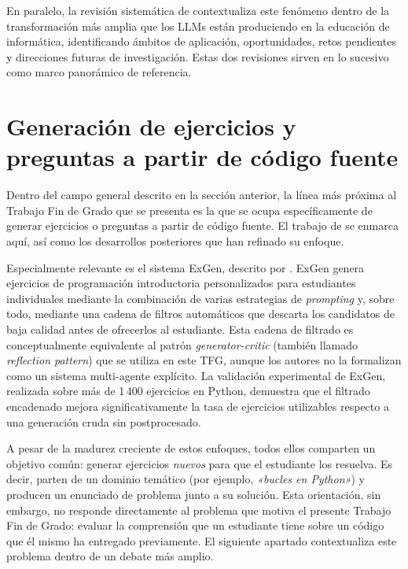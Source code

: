 En paralelo, la revisión sistemática de \textcite{raihan2025llmcse}
contextualiza este fenómeno dentro de la transformación más amplia que
los LLMs están produciendo en la educación de informática, identificando
ámbitos de aplicación, oportunidades, retos pendientes y direcciones
futuras de investigación. Estas dos revisiones sirven en lo sucesivo
como marco panorámico de referencia.


\section{Generación de ejercicios y preguntas a partir de código fuente}
\label{sec:aqg-codigo}

Dentro del campo general descrito en la sección anterior, la línea más
próxima al Trabajo Fin de Grado que se presenta es la que se ocupa
específicamente de generar ejercicios o preguntas a partir de código
fuente. El trabajo de \textcite{sarsa2022autogen} se enmarca aquí, así
como los desarrollos posteriores que han refinado su enfoque.

Especialmente relevante es el sistema ExGen, descrito por
\textcite{ta2026exgen}. ExGen genera ejercicios de programación
introductoria personalizados para estudiantes individuales mediante la
combinación de varias estrategias de \emph{prompting} y, sobre todo,
mediante una cadena de filtros automáticos que descarta los candidatos
de baja calidad antes de ofrecerlos al estudiante. Esta cadena de
filtrado es conceptualmente equivalente al patrón
\emph{generator-critic} (también llamado \emph{reflection pattern}) que
se utiliza en este TFG, aunque los autores no la formalizan como un
sistema multi-agente explícito. La validación experimental de ExGen,
realizada sobre más de 1\,400 ejercicios en Python, demuestra que el
filtrado encadenado mejora significativamente la tasa de ejercicios
utilizables respecto a una generación cruda sin postprocesado.

A pesar de la madurez creciente de estos enfoques, todos ellos comparten
un objetivo común: generar ejercicios \emph{nuevos} para que el
estudiante los resuelva. Es decir, parten de un dominio temático (por
ejemplo, \emph{«bucles en Python»}) y producen un enunciado de problema
junto a su solución. Esta orientación, sin embargo, no responde
directamente al problema que motiva el presente Trabajo Fin de Grado:
evaluar la comprensión que un estudiante tiene sobre un código que él
mismo ha entregado previamente. El siguiente apartado contextualiza este
problema dentro de un debate más amplio.


